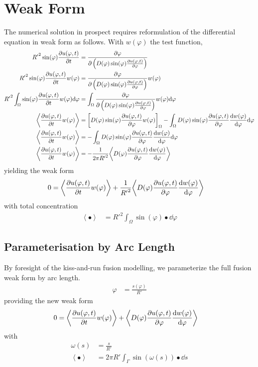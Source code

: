 \documentclass{report}
\newcommand\Par[1]{{ \left({#1}\right) }}
\newcommand\Brack[1]{{ \left[{#1}\right] }}
\newcommand\Angle[1]{{ \left\langle{#1}\right\rangle }}
\newcommand\R{{ R' }}
\begin{document}
\section{Weak Form}
The numerical solution in prospect requires reformulation of the differential equation in weak form as follows. With $w(\varphi)$ the test function,
\begin{align*}
	\R^2 \sin(\varphi) \pdv{u(\varphi, t)}{t} &= \pdv\varphi\Par{D(\varphi) \sin(\varphi) \pdv{u(\varphi, t)}{\varphi}} \\
	\R^2 \sin(\varphi) \pdv{u(\varphi, t)}{t} w(\varphi) &= \pdv\varphi\Par{D(\varphi) \sin(\varphi) \pdv{u(\varphi, t)}{\varphi}} w(\varphi) \\
	\R^2 \int_\Omega \sin(\varphi) \pdv{u(\varphi, t)}{t} w(\varphi) \dd\varphi &= \int_\Omega \pdv\varphi\Par{D(\varphi) \sin(\varphi) \pdv{u(\varphi, t)}{\varphi}} w(\varphi) \dd\varphi \\
	\Angle{\pdv{u(\varphi, t)}{t} w(\varphi)} &= \Brack{D(\varphi) \sin(\varphi) \pdv{u(\varphi, t)}{\varphi} w(\varphi)}_\Omega
	- \int_\Omega D(\varphi) \sin(\varphi) \pdv{u(\varphi, t)}{\varphi} \dv{w(\varphi)}{\varphi} \dd\varphi \\
	\Angle{\pdv{u(\varphi, t)}{t} w(\varphi)} &= -\int_\Omega D(\varphi) \sin(\varphi) \pdv{u(\varphi, t)}{\varphi} \dv{w(\varphi)}{\varphi} \dd\varphi \\
	\Angle{\pdv{u(\varphi, t)}{t} w(\varphi)} &= - \frac{1}{2\pi \R^2} \Angle{D(\varphi) \pdv{u(\varphi, t)}{\varphi} \dv{w(\varphi)}{\varphi}}
\end{align*}
yielding the weak form
\begin{align*}
	0 &= \Angle{\pdv{u(\varphi, t)}{t} w(\varphi)} + \frac{1}{\R^2} \Angle{D(\varphi) \pdv{u(\varphi, t)}{\varphi} \dv{w(\varphi)}{\varphi}}
\end{align*}
with total concentration
\begin{align*}
	\Angle{\bullet} &= \R^2 \int_\Omega \sin(\varphi) \bullet \dd\varphi
\end{align*}

\subsection{Parameterisation by Arc Length}
By foresight of the kiss-and-run fusion modelling, we parameterize the full fusion weak form by arc length.
\begin{align*}
	\varphi &= \frac{s(\varphi)}{\R}
\end{align*}
providing the new weak form
\begin{align*}
	0 &= \Angle{\pdv{u(\varphi, t)}{t} w(\varphi)} + \Angle{D(\varphi) \pdv{u(\varphi, t)}{\varphi} \dv{w(\varphi)}{\varphi}}
\end{align*}
with
\begin{align*}
	\omega(s) &= \frac{s}{\R} \\
	\Angle\bullet &= 2\pi \R \int_\Gamma \sin\Par{\omega(s)} \bullet \dd{s}
\end{align*}
\end{document}

